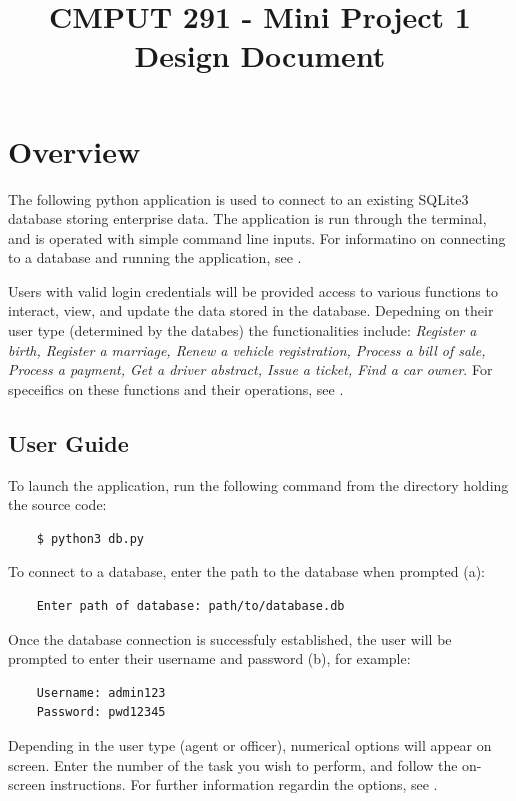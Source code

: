 \documentclass[10pt, a4paper]{article}
\begin{document}
{\selectfont

\title{\vspace{-20mm}CMPUT 291 - Mini Project 1 Design Document}
\date{}
\maketitle
\vspace{-20mm}
\section{Overview}\label{OV}
The following python application is used to connect to an existing SQLite3 database storing enterprise data. The application is run through the terminal, and is operated with simple command line inputs. For informatino on connecting to a database and running the application, see \emph{}.

Users with valid login credentials will be provided access to various functions to interact, view, and update the data stored in the database. Depedning on their user type (determined by the databes) the functionalities include: \emph{Register a birth, Register a marriage, Renew a vehicle registration, Process a bill of sale, Process a payment, Get a driver abstract, Issue a ticket, Find a car owner}. For speceifics on these functions and their operations, see \emph{}.

\subsection{User Guide}\label{UG}
To launch the application, run the following command from the directory holding the source code:
\begin{lstlisting}
    $ python3 db.py
\end{lstlisting}
To connect to a database, enter the path to the database when prompted (a):
\begin{lstlisting}
    Enter path of database: path/to/database.db
\end{lstlisting}
Once the database connection is successfuly established, the user will be prompted to enter their username and password (b), for example:
\begin{lstlisting}
    Username: admin123
    Password: pwd12345
\end{lstlisting}
Depending in the user type (agent or officer), numerical options will appear on screen. Enter the number of the task you wish to perform, and follow the on-screen instructions. For further information regardin the options, see \emph{}. 

}
\end{document}
